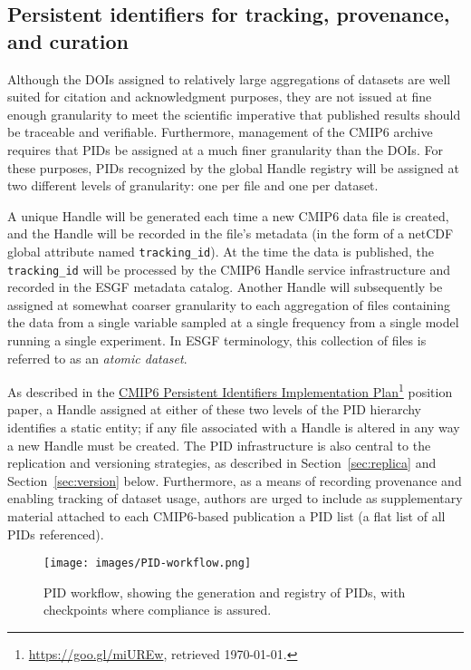 \documentclass[gmd,manuscript]{copernicus}
\newcommand{\pllabel}[1]{\label{p-#1}\linelabel{l-#1}}
\newcommand{\urlref}[2] {\href{#1}{#2}\footnote{\url{#1}, retrieved \today.}}
\begin{document}
\subsection{Persistent identifiers for tracking, provenance, and
  curation}
\label{sec:pid}

Although the DOIs assigned to relatively large aggregations of
datasets are well suited for citation and acknowledgment purposes,
they are not issued at fine enough granularity to meet the scientific
imperative that published results should be traceable and verifiable.
Furthermore, management of the CMIP6 archive requires that PIDs be
assigned at a much finer granularity than the DOIs. For these
purposes, PIDs recognized by the global Handle registry will be
assigned at two different levels of granularity: one per file and 
one per dataset.

A unique Handle will be generated each time a new CMIP6 data file is
created, and the Handle will be recorded in the file's metadata (in
the form of a netCDF global attribute named \texttt{tracking\_id}). At
the time the data is published, the \texttt{tracking\_id} will be
processed by the CMIP6 Handle service infrastructure and recorded in
the ESGF metadata catalog. Another Handle will subsequently be
assigned at somewhat coarser granularity to each aggregation of files
containing the data from a single variable sampled at a single
frequency
\pllabel{RC1-45}
from a single model running a single experiment. In ESGF terminology,
this collection of files is referred to as an \emph{atomic dataset}.

As described in the \urlref{https://goo.gl/miUREw}{CMIP6 Persistent
  Identifiers Implementation Plan} position paper, a Handle assigned
at either of these two levels of the PID hierarchy identifies a static
entity; if any file associated with a Handle is altered in any way a
new Handle must be created. The PID infrastructure is also central to
the replication and versioning strategies, as described in
Section~\ref{sec:replica} and Section~\ref{sec:version} below.
Furthermore, as a means of recording provenance and enabling tracking
of dataset usage, authors are urged to include as supplementary
material attached to each CMIP6-based publication a PID list (a flat
list of all PIDs referenced).

\begin{figure*}
  \begin{center}
    \texttt{[image: images/PID-workflow.png]}
  \end{center}
  \caption{PID workflow, showing the generation and registry of PIDs,
    with checkpoints where compliance is assured.}
  \label{fig:pidflow}
\end{figure*}
\end{document}
